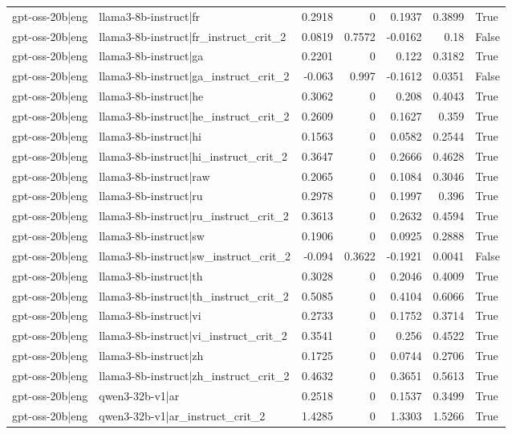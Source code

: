 \begin{table}
\begin{tabular}{l l r r r r l}
gpt-oss-20b|eng & llama3-8b-instruct|fr & 0.2918 & 0 & 0.1937 & 0.3899 & True \\
gpt-oss-20b|eng & llama3-8b-instruct|fr_instruct_crit_2 & 0.0819 & 0.7572 & -0.0162 & 0.18 & False \\
gpt-oss-20b|eng & llama3-8b-instruct|ga & 0.2201 & 0 & 0.122 & 0.3182 & True \\
gpt-oss-20b|eng & llama3-8b-instruct|ga_instruct_crit_2 & -0.063 & 0.997 & -0.1612 & 0.0351 & False \\
gpt-oss-20b|eng & llama3-8b-instruct|he & 0.3062 & 0 & 0.208 & 0.4043 & True \\
gpt-oss-20b|eng & llama3-8b-instruct|he_instruct_crit_2 & 0.2609 & 0 & 0.1627 & 0.359 & True \\
gpt-oss-20b|eng & llama3-8b-instruct|hi & 0.1563 & 0 & 0.0582 & 0.2544 & True \\
gpt-oss-20b|eng & llama3-8b-instruct|hi_instruct_crit_2 & 0.3647 & 0 & 0.2666 & 0.4628 & True \\
gpt-oss-20b|eng & llama3-8b-instruct|raw & 0.2065 & 0 & 0.1084 & 0.3046 & True \\
gpt-oss-20b|eng & llama3-8b-instruct|ru & 0.2978 & 0 & 0.1997 & 0.396 & True \\
gpt-oss-20b|eng & llama3-8b-instruct|ru_instruct_crit_2 & 0.3613 & 0 & 0.2632 & 0.4594 & True \\
gpt-oss-20b|eng & llama3-8b-instruct|sw & 0.1906 & 0 & 0.0925 & 0.2888 & True \\
gpt-oss-20b|eng & llama3-8b-instruct|sw_instruct_crit_2 & -0.094 & 0.3622 & -0.1921 & 0.0041 & False \\
gpt-oss-20b|eng & llama3-8b-instruct|th & 0.3028 & 0 & 0.2046 & 0.4009 & True \\
gpt-oss-20b|eng & llama3-8b-instruct|th_instruct_crit_2 & 0.5085 & 0 & 0.4104 & 0.6066 & True \\
gpt-oss-20b|eng & llama3-8b-instruct|vi & 0.2733 & 0 & 0.1752 & 0.3714 & True \\
gpt-oss-20b|eng & llama3-8b-instruct|vi_instruct_crit_2 & 0.3541 & 0 & 0.256 & 0.4522 & True \\
gpt-oss-20b|eng & llama3-8b-instruct|zh & 0.1725 & 0 & 0.0744 & 0.2706 & True \\
gpt-oss-20b|eng & llama3-8b-instruct|zh_instruct_crit_2 & 0.4632 & 0 & 0.3651 & 0.5613 & True \\
gpt-oss-20b|eng & qwen3-32b-v1|ar & 0.2518 & 0 & 0.1537 & 0.3499 & True \\
gpt-oss-20b|eng & qwen3-32b-v1|ar_instruct_crit_2 & 1.4285 & 0 & 1.3303 & 1.5266 & True \\

\end{tabular}
\end{table}
